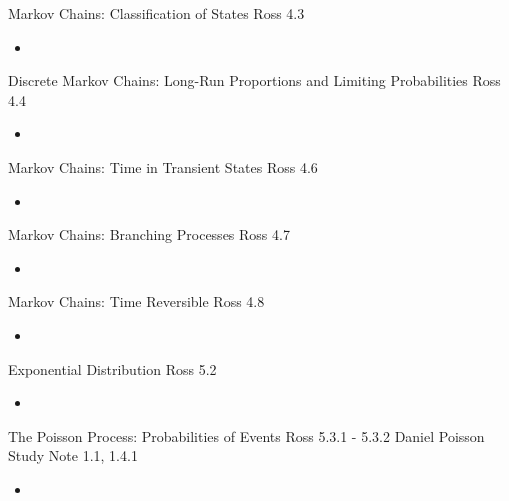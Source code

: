 \begin{CHPT_SUMM_AUTO_NUMB}[label = {L.-5}]{Markov Chains: Classification of States}
Ross 4.3
	\begin{itemize}
		\item	
	\end{itemize}
\end{CHPT_SUMM_AUTO_NUMB}

\begin{CHPT_SUMM_AUTO_NUMB}[label = {L.-6}]{Discrete Markov Chains: Long-Run Proportions and Limiting Probabilities}
Ross 4.4
	\begin{itemize}
		\item	
	\end{itemize}
\end{CHPT_SUMM_AUTO_NUMB}

\begin{CHPT_SUMM_AUTO_NUMB}[label = {L.-7}]{Markov Chains: Time in Transient States}
Ross 4.6
	\begin{itemize}
		\item	
	\end{itemize}
\end{CHPT_SUMM_AUTO_NUMB}

\begin{CHPT_SUMM_AUTO_NUMB}[label = {L.-8}]{Markov Chains: Branching Processes}
Ross 4.7
	\begin{itemize}
		\item	
	\end{itemize}
\end{CHPT_SUMM_AUTO_NUMB}

\begin{CHPT_SUMM_AUTO_NUMB}[label = {L.-9}]{Markov Chains: Time Reversible}
Ross 4.8
	\begin{itemize}
		\item	
	\end{itemize}
\end{CHPT_SUMM_AUTO_NUMB}

\begin{CHPT_SUMM_AUTO_NUMB}[label = {L.-10}]{Exponential Distribution}
Ross 5.2
	\begin{itemize}
		\item	
	\end{itemize}
\end{CHPT_SUMM_AUTO_NUMB}

\begin{CHPT_SUMM_AUTO_NUMB}[label = {L.-11}]{The Poisson Process: Probabilities of Events}
Ross 5.3.1 - 5.3.2
Daniel Poisson Study Note 1.1, 1.4.1
	\begin{itemize}
		\item	
	\end{itemize}
\end{CHPT_SUMM_AUTO_NUMB}

